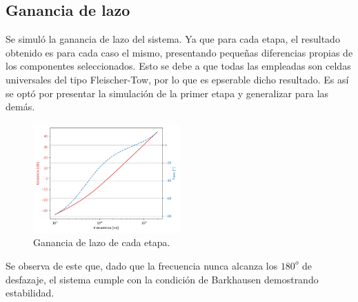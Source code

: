 \subsection{Ganancia de lazo}
Se simuló la ganancia de lazo del sistema. Ya que para cada etapa, el resultado obtenido es para cada caso el mismo, presentando pequeñas diferencias propias de los componentes seleccionados. Esto se debe a que todas las empleadas son celdas universales del tipo Fleischer-Tow, por lo que es epserable dicho resultado. Es así se optó por presentar la simulación de la primer etapa y generalizar para las demás.
\begin{figure}[H]
\centering
	\includegraphics[width=0.5\textwidth]{Imagenes/GananciaDeLazo.png}
	\caption{Ganancia de lazo de cada etapa.}
\label{fig:lazo}
\end{figure}

Se observa de este que, dado que la frecuencia nunca alcanza los $180^o$ de desfazaje, el sistema cumple con la condición de Barkhausen demostrando estabilidad.



